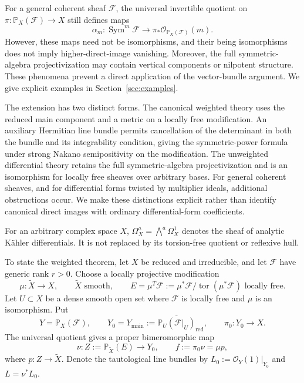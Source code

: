 \documentclass[11pt,reqno]{amsart}
\numberwithin{equation}{section}
\theoremstyle{definition}
\theoremstyle{remark}
\newcommand{\OO}{\mathcal O}
\newcommand{\FF}{\mathcal F}
\newcommand{\PP}{\mathbb P}
\newcommand{\Sym}{\operatorname{Sym}}
\newcommand{\Tor}{\operatorname{tor}}
\newcommand{\main}{\mathrm{main}}
\begin{document}
For a general coherent sheaf $\FF$, the universal invertible quotient on $\pi:\PP_X(\FF)\to X$ still defines maps
\[
 \alpha_m:\Sym^m\FF\longrightarrow\pi_*\OO_{\PP_X(\FF)}(m).
\]
However, these maps need not be isomorphisms, and their being isomorphisms does not imply higher-direct-image vanishing. Moreover, the full symmetric-algebra projectivization may contain vertical components or nilpotent structure. These phenomena prevent a direct application of the vector-bundle argument. We give explicit examples in Section~\ref{sec:examples}.

The extension has two distinct forms. The canonical weighted theory uses the reduced main component and a metric on a locally free modification. An auxiliary Hermitian line bundle permits cancellation of the determinant in both the bundle and its integrability condition, giving the symmetric-power formula under strong Nakano semipositivity on the modification. The unweighted differential theory retains the full symmetric-algebra projectivization and is an isomorphism for locally free sheaves over arbitrary bases. For general coherent sheaves, and for differential forms twisted by multiplier ideals, additional obstructions occur. We make these distinctions explicit rather than identify canonical direct images with ordinary differential-form coefficients.

For an arbitrary complex space $X$, $\Omega_X^a=\bigwedge^a\Omega_X^1$ denotes the sheaf of analytic K\"ahler differentials. It is not replaced by its torsion-free quotient or reflexive hull.

To state the weighted theorem, let $X$ be reduced and irreducible, and let $\FF$ have generic rank $r>0$. Choose a locally projective modification
\[
 \mu:\widetilde X\longrightarrow X,
 \qquad \widetilde X\text{ smooth},\qquad
 E=\mu^T\FF:=\mu^*\FF/\Tor(\mu^*\FF)\text{ locally free}.
\]
Let $U\subset X$ be a dense smooth open set where $\FF$ is locally free and $\mu$ is an isomorphism. Put
\[
 Y=\PP_X(\FF),\qquad
 Y_0=Y_{\main}:=\overline{\PP_U(\FF|_U)}_{\mathrm{red}},\qquad
 \pi_0:Y_0\to X.
\]
The universal quotient gives a proper bimeromorphic map
\[
 \nu:Z:=\PP_{\widetilde X}(E)\longrightarrow Y_0,
 \qquad f:=\pi_0\nu=\mu p,
\]
where $p:Z\to\widetilde X$. Denote the tautological line bundles by $L_0:=\OO_{Y}(1)|_{Y_0}$ and $L=\nu^*L_0$.
\end{document}
